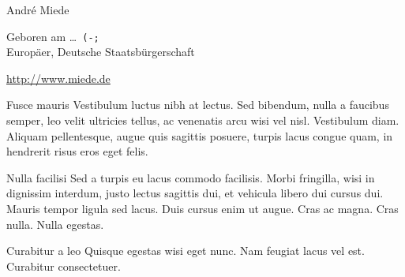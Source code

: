 \documentclass[fontsize=10pt,paper=a4]{scrartcl}
\begin{document}
    \pagestyle{plain}
    \begin{cv}{}
        \begin{cvlist}{}\label{PersDat}  %
            \item   Andr\'e Miede
            \item   Geboren am \dots\ \texttt{(-;} \\
                    Europ\"aer, Deutsche Staatsb\"urgerschaft
            \item   \url{http://www.miede.de} 
        \end{cvlist}

        \begin{cvlist}{}\label{irgendwas}
            \item[Fusce mauris]   Vestibulum luctus nibh at lectus. Sed bibendum, nulla a faucibus semper, leo velit ultricies tellus, ac venenatis arcu wisi vel nisl. Vestibulum diam. Aliquam pellentesque, augue quis sagittis posuere, turpis lacus congue quam, in hendrerit risus eros eget felis. 
            \item[Nulla facilisi] Sed a turpis eu lacus commodo facilisis. Morbi fringilla, wisi in dignissim interdum, justo lectus sagittis dui, et vehicula libero dui cursus dui. Mauris tempor ligula sed lacus. Duis cursus enim ut augue. Cras ac magna. Cras nulla. Nulla egestas. 
            \item[Curabitur a leo] Quisque egestas wisi eget nunc. Nam feugiat lacus vel est. Curabitur consectetuer.
        \end{cvlist}
    \end{cv}
\end{document}
